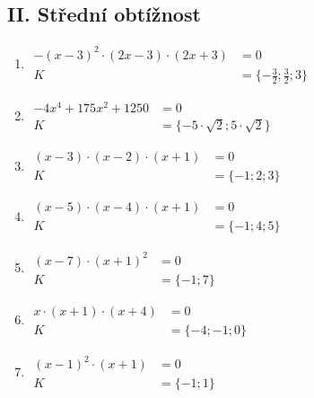 \documentclass[11pt,a4paper]{article}
\begin{document}
\subsection*{II. Střední obtížnost}
\begin{enumerate}[label={},itemsep=9pt]
\item[\textbf{B001}] \(\displaystyle \begin{aligned}- \left(x - 3\right)^{2} \cdot \left(2x - 3\right) \cdot \left(2x + 3\right)&=0\\K&=\{- \frac{3}{2};\frac{3}{2};3\}\end{aligned}\)\par
\item[\textbf{B002}] \(\displaystyle \begin{aligned}- 4x^{4} + 175x^{2} + 1250&=0\\K&=\{- 5 \cdot \sqrt{2};5 \cdot \sqrt{2}\}\end{aligned}\)\par
\item[\textbf{B003}] \(\displaystyle \begin{aligned}\left(x - 3\right) \cdot \left(x - 2\right) \cdot \left(x + 1\right)&=0\\K&=\{-1;2;3\}\end{aligned}\)\par
\item[\textbf{B004}] \(\displaystyle \begin{aligned}\left(x - 5\right) \cdot \left(x - 4\right) \cdot \left(x + 1\right)&=0\\K&=\{-1;4;5\}\end{aligned}\)\par
\item[\textbf{B005}] \(\displaystyle \begin{aligned}\left(x - 7\right) \cdot \left(x + 1\right)^{2}&=0\\K&=\{-1;7\}\end{aligned}\)\par
\item[\textbf{B006}] \(\displaystyle \begin{aligned}x \cdot \left(x + 1\right) \cdot \left(x + 4\right)&=0\\K&=\{-4;-1;0\}\end{aligned}\)\par
\item[\textbf{B007}] \(\displaystyle \begin{aligned}\left(x - 1\right)^{2} \cdot \left(x + 1\right)&=0\\K&=\{-1;1\}\end{aligned}\)\par

\end{enumerate}
\end{document}
